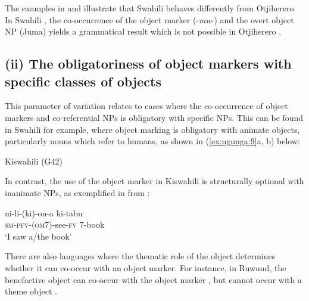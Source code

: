 \documentclass[output=paper]{langscibook}
\begin{document}
\z

The examples in  and  illustrate that Swahili behaves differently from Otjiherero. In Swahili , the co-occurrence of the object marker (-\textit{mw}{}-) and the overt object NP (Juma) yields a grammatical result which is not possible in Otjiherero . 

\subsection{(ii) The obligatoriness of object markers with specific classes of objects}

This parameter of variation relates to cases where the co-occurrence of object markers and co-referential NPs is obligatory with specific NPs. This can be found in Swahili for example, where object marking is obligatory with animate objects, particularly nouns which refer to humans, as shown in (\ref{ex:ngunga:9}a, b) below:

\ea\label{ex:ngunga:9}  Kiswahili (G42)  \citep[46]{Riedel2009}\\

    \z
\z

In contrast, the use of the object marker in Kiswahili is structurally optional with inanimate NPs, as exemplified in  from \citet[241]{MartenKula2012}:

\ea\label{ex:ngunga:9c}
\gll ni-li-(ki)-on-a    ki-tabu  \\
{\textsc{sm}-\textsc{pfv}-(\textsc{om7})-see-\textsc{fv}}    7-book\\
\glt ‘I saw a/the book’
\z

There are also languages where the thematic role of the object determines whether it can co-occur with an object marker. For instance, in Ruwund, the benefactive object can co-occur with the object marker , but cannot occur with a theme object .
\end{document}
